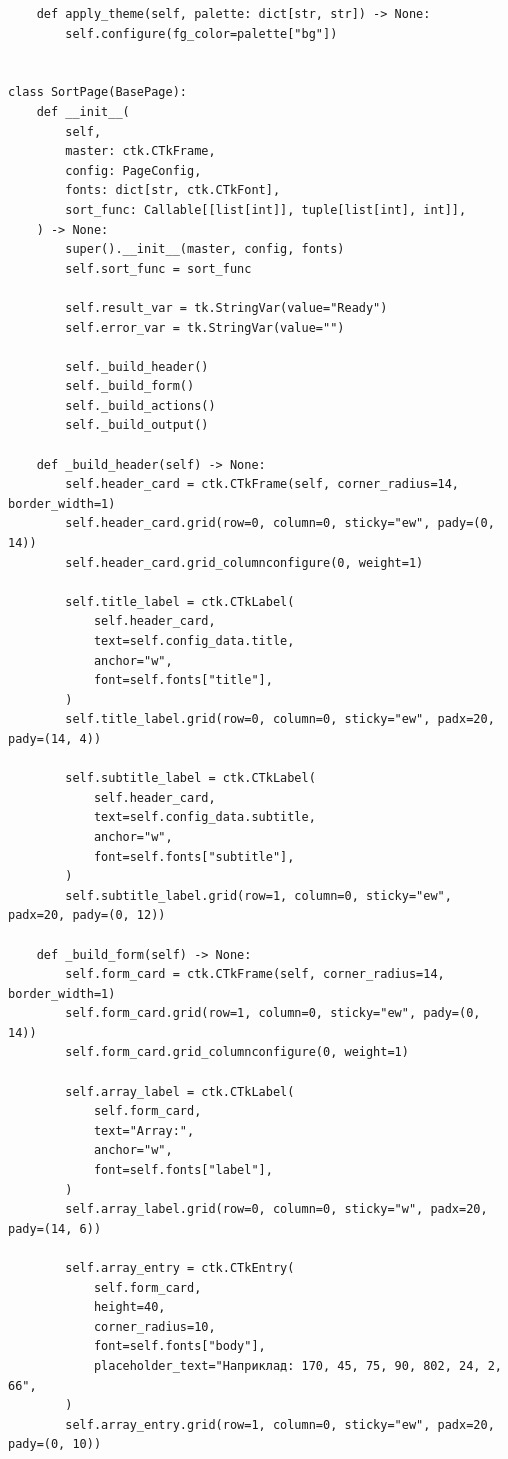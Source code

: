 \documentclass[12pt,a4paper]{article}
\begin{document}
\begin{verbatim}
    def apply_theme(self, palette: dict[str, str]) -> None:
        self.configure(fg_color=palette["bg"])


class SortPage(BasePage):
    def __init__(
        self,
        master: ctk.CTkFrame,
        config: PageConfig,
        fonts: dict[str, ctk.CTkFont],
        sort_func: Callable[[list[int]], tuple[list[int], int]],
    ) -> None:
        super().__init__(master, config, fonts)
        self.sort_func = sort_func

        self.result_var = tk.StringVar(value="Ready")
        self.error_var = tk.StringVar(value="")

        self._build_header()
        self._build_form()
        self._build_actions()
        self._build_output()

    def _build_header(self) -> None:
        self.header_card = ctk.CTkFrame(self, corner_radius=14, border_width=1)
        self.header_card.grid(row=0, column=0, sticky="ew", pady=(0, 14))
        self.header_card.grid_columnconfigure(0, weight=1)

        self.title_label = ctk.CTkLabel(
            self.header_card,
            text=self.config_data.title,
            anchor="w",
            font=self.fonts["title"],
        )
        self.title_label.grid(row=0, column=0, sticky="ew", padx=20, pady=(14, 4))

        self.subtitle_label = ctk.CTkLabel(
            self.header_card,
            text=self.config_data.subtitle,
            anchor="w",
            font=self.fonts["subtitle"],
        )
        self.subtitle_label.grid(row=1, column=0, sticky="ew", padx=20, pady=(0, 12))

    def _build_form(self) -> None:
        self.form_card = ctk.CTkFrame(self, corner_radius=14, border_width=1)
        self.form_card.grid(row=1, column=0, sticky="ew", pady=(0, 14))
        self.form_card.grid_columnconfigure(0, weight=1)

        self.array_label = ctk.CTkLabel(
            self.form_card,
            text="Array:",
            anchor="w",
            font=self.fonts["label"],
        )
        self.array_label.grid(row=0, column=0, sticky="w", padx=20, pady=(14, 6))

        self.array_entry = ctk.CTkEntry(
            self.form_card,
            height=40,
            corner_radius=10,
            font=self.fonts["body"],
            placeholder_text="Наприклад: 170, 45, 75, 90, 802, 24, 2, 66",
        )
        self.array_entry.grid(row=1, column=0, sticky="ew", padx=20, pady=(0, 10))


\end{verbatim}
\end{document}
